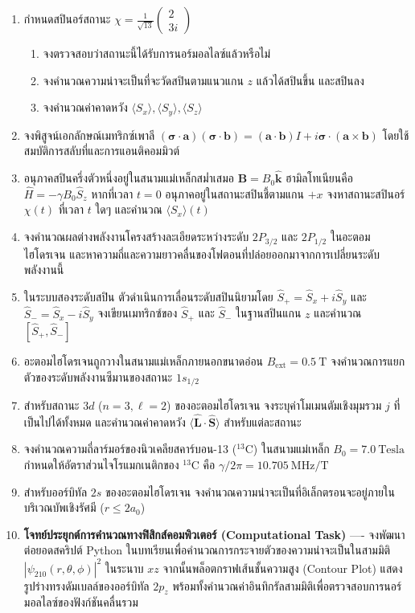 \begin{enumerate}[label=\textbf{\arabic*.}]
    \item กำหนดสปินอร์สถานะ $\chi = \frac{1}{\sqrt{13}} \begin{pmatrix} 2 \\ 3i \end{pmatrix}$
    \begin{enumerate}
        \item จงตรวจสอบว่าสถานะนี้ได้รับการนอร์มอลไลซ์แล้วหรือไม่
        \item จงคำนวณความน่าจะเป็นที่จะวัดสปินตามแนวแกน $z$ แล้วได้สปินขึ้น และสปินลง
        \item จงคำนวณค่าคาดหวัง $\langle S_x \rangle, \langle S_y \rangle, \langle S_z \rangle$
    \end{enumerate}
    \item จงพิสูจน์เอกลักษณ์เมทริกซ์เพาลี $(\boldsymbol{\sigma}\cdot\mathbf{a})(\boldsymbol{\sigma}\cdot\mathbf{b}) = (\mathbf{a}\cdot\mathbf{b}) I + i \boldsymbol{\sigma}\cdot(\mathbf{a}\times\mathbf{b})$ โดยใช้สมบัติการสลับที่และการแอนติคอมมิวต์
    \item อนุภาคสปินครึ่งตัวหนึ่งอยู่ในสนามแม่เหล็กสม่ำเสมอ $\mathbf{B} = B_0 \hat{\mathbf{k}}$ ฮามิลโทเนียนคือ $\hat{H} = -\gamma B_0 \hat{S}_z$ หากที่เวลา $t = 0$ อนุภาคอยู่ในสถานะสปินชี้ตามแกน $+x$ จงหาสถานะสปินอร์ $\chi(t)$ ที่เวลา $t$ ใดๆ และคำนวณ $\langle S_x \rangle(t)$
    \item จงคำนวณผลต่างพลังงานโครงสร้างละเอียดระหว่างระดับ $2P_{3/2}$ และ $2P_{1/2}$ ในอะตอมไฮโดรเจน และหาความถี่และความยาวคลื่นของโฟตอนที่ปล่อยออกมาจากการเปลี่ยนระดับพลังงานนี้
    \item ในระบบสองระดับสปิน ตัวดำเนินการเลื่อนระดับสปินนิยามโดย $\hat{S}_+ = \hat{S}_x + i\hat{S}_y$ และ $\hat{S}_- = \hat{S}_x - i\hat{S}_y$ จงเขียนเมทริกซ์ของ $\hat{S}_+$ และ $\hat{S}_-$ ในฐานสปินแกน $z$ และคำนวณ $[\hat{S}_+, \hat{S}_-]$
    \item อะตอมไฮโดรเจนถูกวางในสนามแม่เหล็กภายนอกขนาดอ่อน $B_{\text{ext}} = 0.5~\text{T}$ จงคำนวณการแยกตัวของระดับพลังงานซีมานของสถานะ $1s_{1/2}$
    \item สำหรับสถานะ $3d$ ($n=3, \ell=2$) ของอะตอมไฮโดรเจน จงระบุค่าโมเมนตัมเชิงมุมรวม $j$ ที่เป็นไปได้ทั้งหมด และคำนวณค่าคาดหวัง $\langle \hat{\mathbf{L}}\cdot\hat{\mathbf{S}} \rangle$ สำหรับแต่ละสถานะ
    \item จงคำนวณความถี่ลาร์มอร์ของนิวเคลียสคาร์บอน-13 ($^{13}\text{C}$) ในสนามแม่เหล็ก $B_0 = 7.0~\text{Tesla}$ กำหนดให้อัตราส่วนไจโรแมกเนติกของ $^{13}\text{C}$ คือ $\gamma/2\pi = 10.705~\text{MHz/T}$
    \item สำหรับออร์บิทัล $2s$ ของอะตอมไฮโดรเจน จงคำนวณความน่าจะเป็นที่อิเล็กตรอนจะอยู่ภายในบริเวณบัพเชิงรัศมี ($r \le 2a_0$)
    \item \textbf{โจทย์ประยุกต์การคำนวณทางฟิสิกส์คอมพิวเตอร์ (Computational Task)} ---- จงพัฒนาต่อยอดสคริปต์ Python ในบทเรียนเพื่อคำนวณการกระจายตัวของความน่าจะเป็นในสามมิติ $|\psi_{210}(r, \theta, \phi)|^2$ ในระนาบ $xz$ จากนั้นพล็อตกราฟเส้นชั้นความสูง (Contour Plot) แสดงรูปร่างทรงดัมเบลล์ของออร์บิทัล $2p_z$ พร้อมทั้งคำนวณค่าอินทิกรัลสามมิติเพื่อตรวจสอบการนอร์มอลไลซ์ของฟังก์ชันคลื่นรวม
\end{enumerate}
